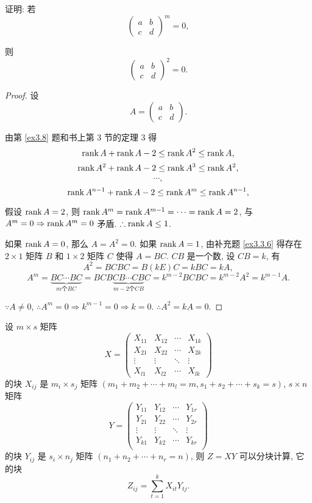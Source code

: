 \documentclass{ctexart}
\begin{document}
\begin{exercise}%
    证明: 若
    \[\begin{pmatrix}
        a & b \\
        c & d
    \end{pmatrix}^m=0,\]

    则
    \[\begin{pmatrix}
        a & b \\
        c & d
    \end{pmatrix}^2=0.\]
\end{exercise}
\begin{proof}
    设
    \[A=\begin{pmatrix}
        a & b \\
        c & d
    \end{pmatrix}.\]

    由第 \ref{ex3.8} 题和书上第 3 节的定理 3 得
    \[\operatorname{rank} A+\operatorname{rank} A-2\leq\operatorname{rank} A^2\leq\operatorname{rank} A,\]
    \[\operatorname{rank} A^2+\operatorname{rank} A-2\leq\operatorname{rank} A^3\leq\operatorname{rank} A^2,\]
    \[\cdots,\]
    \[\operatorname{rank} A^{n-1}+\operatorname{rank} A-2\leq\operatorname{rank} A^m\leq\operatorname{rank} A^{n-1},\]

    假设 $\operatorname{rank} A=2$, 则 $\operatorname{rank} A^m=\operatorname{rank} A^{m-1}=\cdots=\operatorname{rank} A=2$, 与 $A^m=0\Rightarrow\operatorname{rank} A^m=0$ 矛盾. $\therefore\operatorname{rank} A\leq 1$.

    如果 $\operatorname{rank} A=0$, 那么 $A=A^2=0$. 如果 $\operatorname{rank} A=1$, 由补充题 \ref{ex3.3.6} 得存在 $2\times1$ 矩阵 $B$ 和 $1\times 2$ 矩阵 $C$ 使得 $A=BC$. $CB$ 是一个数, 设 $CB=k$, 有
    \[A^2=BCBC=B(kE)C=kBC=kA,\]
    \[A^m=\underbrace{BC\cdots BC}_{m\text{个}BC}=BCB\underbrace{CB\cdots CB}_{m-2\text{个}CB}C=k^{m-2}BCBC=k^{m-2}A^2=k^{m-1}A.\]

    $\because A\neq0$, $\therefore A^m=0\Rightarrow k^{m-1}=0\Rightarrow k=0$. $\therefore A^2=kA=0$.
\end{proof}
\begin{exercise}\label{ex3.17}
    设 $m\times s$ 矩阵
    \[X=\begin{pmatrix}
        X_{11} & X_{12} & \cdots & X_{1k} \\
        X_{21} & X_{22} & \cdots & X_{2k} \\
        \vdots & \vdots & \ddots & \vdots \\
        X_{l1} & X_{l2} & \cdots & X_{lk}
    \end{pmatrix}\]
    的块 $X_{ij}$ 是 $m_i\times s_j$ 矩阵 $(m_1+m_2+\cdots+m_l=m,s_1+s_2+\cdots+s_k=s)$, $s\times n$ 矩阵
    \[Y=\begin{pmatrix}
        Y_{11} & Y_{12} & \cdots & Y_{1r} \\
        Y_{21} & Y_{22} & \cdots & Y_{2r} \\
        \vdots & \vdots & \ddots & \vdots \\
        Y_{k1} & Y_{k2} & \cdots & Y_{kr} \\
    \end{pmatrix}\]
    的块 $Y_{ij}$ 是 $s_i\times n_j$ 矩阵 $(n_1+n_2+\cdots+n_r=n)$, 则 $Z=XY$ 可以分块计算, 它的块
    \[Z_{ij}=\sum\limits_{t=1}^kX_{it}Y_{tj}.\]
\end{exercise}
\end{document}
